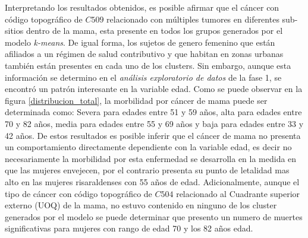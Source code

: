 Interpretando los resultados obtenidos, es posible afirmar que el cáncer con código topográfico de $C509$ relacionado con múltiples tumores en diferentes sub-sitios dentro de la mama, esta presente en todos los grupos generados por el modelo \textit{k-means}. De igual forma, los sujetos de genero femenino que están afiliados a un régimen de salud contributivo y que habitan en zonas urbanas también están presentes en cada uno de los clusters. Sin embargo, aunque esta información se determino en el \textit{análisis exploratorio de datos} de la fase 1, se encontró un patrón interesante en la variable edad. Como se puede observar en la figura \ref{distribucion_total}, la morbilidad por cáncer de mama puede ser determinada como: Severa para edades entre 51 y 59 años, alta para edades entre 70 y 82 años, media para edades entre 55 y 69 años y baja para edades entre 33 y 42 años. De estos resultados es posible inferir que el cáncer de mama no presenta un comportamiento directamente dependiente con la variable edad, es decir no necesariamente la morbilidad por esta enfermedad se desarrolla en la medida en que las mujeres envejecen, por el contrario presenta su punto de letalidad mas alto en las mujeres risaraldenses con 55 años de edad. Adicionalmente, aunque el tipo de cáncer con código topográfico de $C504$ relacionado al Cuadrante superior externo (UOQ) de la mama, no estuvo contenido en ninguno de los cluster generados por el modelo se puede determinar que presento un numero de muertes significativas para mujeres con rango de edad 70 y los 82 años edad.
